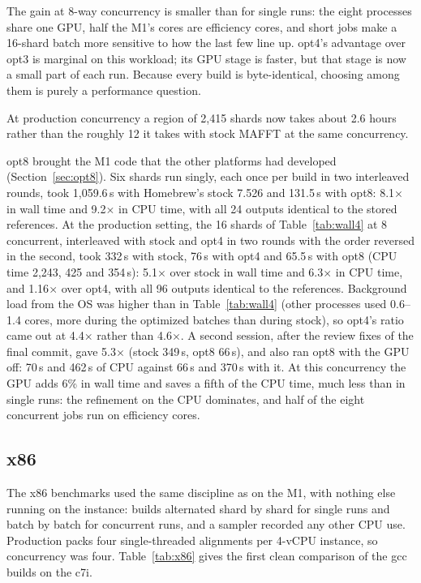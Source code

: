 \documentclass[11pt]{article}
\begin{document}
The gain at 8-way concurrency is smaller than for single runs: the eight processes share one
GPU, half the M1's cores are efficiency cores, and short jobs make a 16-shard batch more
sensitive to how the last few line up. opt4's advantage over opt3 is marginal on this
workload; its GPU stage is faster, but that stage is now a small part of each run. Because
every build is byte-identical, choosing among them is purely a performance question.

At production concurrency a region of 2{,}415 shards now takes about 2.6 hours rather than
the roughly 12 it takes with stock MAFFT at the same concurrency.

opt8 brought the M1 code that the other platforms had developed (Section~\ref{sec:opt8}). Six
shards run singly, each once per build in two interleaved rounds, took 1{,}059.6\,s with Homebrew's
stock 7.526 and 131.5\,s with opt8: 8.1$\times$ in wall time and 9.2$\times$ in CPU time, with all 24
outputs identical to the stored references. At the production setting, the 16 shards of
Table~\ref{tab:wall4} at 8 concurrent, interleaved with stock and opt4 in two rounds with the
order reversed in the second, took 332\,s with stock, 76\,s with opt4 and 65.5\,s with opt8 (CPU
time 2{,}243, 425 and 354\,s): 5.1$\times$ over stock in wall time and 6.3$\times$ in CPU time, and
1.16$\times$ over opt4, with all 96 outputs identical to the references. Background load from the
OS was higher than in Table~\ref{tab:wall4} (other processes used 0.6--1.4 cores, more during the
optimized batches than during stock), so opt4's ratio came out at 4.4$\times$ rather than
4.6$\times$. A second session, after the review fixes of the final commit, gave 5.3$\times$ (stock
349\,s, opt8 66\,s), and also ran opt8 with the GPU off: 70\,s and 462\,s of CPU against 66\,s and
370\,s with it. At this concurrency the GPU adds 6\% in wall time and saves a fifth of the CPU
time, much less than in single runs: the refinement on the CPU dominates, and half of the eight
concurrent jobs run on efficiency cores.

\subsection{x86}

The x86 benchmarks used the same discipline as on the M1, with nothing else running on the
instance: builds alternated shard by shard for single runs and batch by batch for concurrent
runs, and a sampler recorded any other CPU use. Production packs four single-threaded
alignments per 4-vCPU instance, so concurrency was four. Table~\ref{tab:x86} gives the
first clean comparison of the gcc builds on the c7i.
\end{document}
